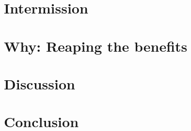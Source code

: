 \documentclass[oneside]{book}
\begin{document}


\epigraphhead[450]{}
\part{Intermission}


\epigraphhead[450]{}
\part{Why: Reaping the benefits}




\epigraphhead[450]{}
\part{Discussion}


\epigraphhead[450]{}
\part{Conclusion}


\renewcommand\bibname{References}





\end{document}
